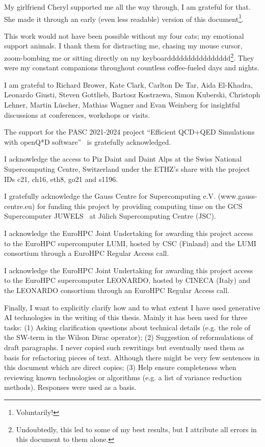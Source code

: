 My girlfriend Cheryl supported me all the way through, I am grateful for that.
She made it through an early (even less readable) version of this document\footnote{Voluntarily!}.

This work would not have been possible without my four cats;
my emotional support animals.
I thank them for distracting me, chasing my mouse cursor, zoom-bombing me or sitting directly on my keyboardddddddddddddddd\footnote{Undoubtedly, this led to some of my best results, but I attribute all errors in this document to them alone.}.
They were my constant companions throughout countless coffee-fueled days and nights.

I am grateful to Richard Brower, Kate Clark, Carlton De Tar, Aida El-Khadra, Leonardo Giusti, Steven Gottlieb, Bartosz Kostrzewa, Simon Kuberski, Christoph Lehner, Martin Lüscher, Mathias Wagner and Evan Weinberg for insightful discussions at conferences, workshops or visits.

The support for the PASC 2021-2024 project ``Efficient QCD+QED Simulations with openQ*D software''~\cite{online:pasc2021} is gratefully acknowledged.

I acknowledge the access to Piz Daint and Daint Alps at the Swiss National Supercomputing Centre, Switzerland under the ETHZ’s share with the project IDs c21, ch16, eth8, go21 and s1196.

I gratefully acknowledge the Gauss Centre for Supercomputing e.V. (www.gauss-centre.eu) for funding this project by providing computing time on the GCS Supercomputer JUWELS~\cite{juwels} at Jülich Supercomputing Centre (JSC). 

I acknowledge the EuroHPC Joint Undertaking for awarding this project access to the EuroHPC supercomputer LUMI, hosted by CSC (Finland) and the LUMI consortium through a EuroHPC Regular Access call.

I acknowledge the EuroHPC Joint Undertaking for awarding this project access to the EuroHPC supercomputer LEONARDO, hosted by CINECA (Italy) and the LEONARDO consortium through an EuroHPC Regular Access call.


Finally, I want to explicitly clarify how and to what extent I have used generative AI technologies in the writing of this thesis.
Mainly it has been used for three tasks:
(1) Asking clarification questions about technical details (e.g. the role of the SW-term in the Wilson Dirac operator);
(2) Suggestion of reformulations of draft paragraphs. 
I never copied such rewritings but eventually used them as basis for refactoring pieces of text.
Although there might be very few sentences in this document which are direct copies;
(3) Help ensure completeness when reviewing known technologies or algorithms (e.g. a list of variance reduction methods).
Responses were used as a basis.


\endgroup

